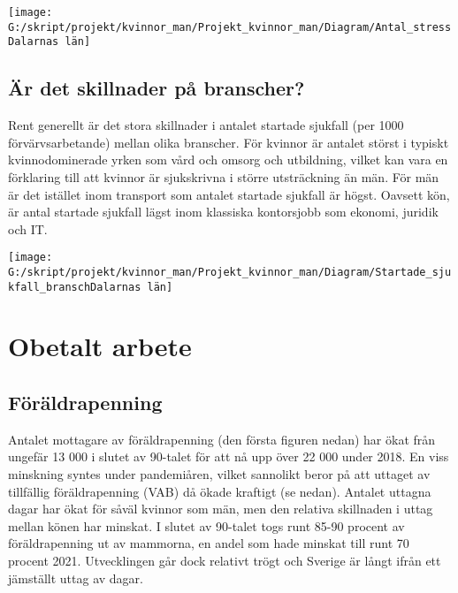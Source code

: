 \documentclass[
]{article}
\begin{document}
\begin{center}\texttt{[image: G:/skript/projekt/kvinnor\_man/Projekt\_kvinnor\_man/Diagram/Antal\_stressDalarnas län]} \end{center}

\hypertarget{uxe4r-det-skillnader-puxe5-branscher}{%
\subsection{Är det skillnader på
branscher?}\label{uxe4r-det-skillnader-puxe5-branscher}}

Rent generellt är det stora skillnader i antalet startade sjukfall (per
1000 förvärvsarbetande) mellan olika branscher. För kvinnor är antalet
störst i typiskt kvinnodominerade yrken som vård och omsorg och
utbildning, vilket kan vara en förklaring till att kvinnor är
sjukskrivna i större utsträckning än män. För män är det istället inom
transport som antalet startade sjukfall är högst. Oavsett kön, är antal
startade sjukfall lägst inom klassiska kontorsjobb som ekonomi, juridik
och IT.

\begin{center}\texttt{[image: G:/skript/projekt/kvinnor\_man/Projekt\_kvinnor\_man/Diagram/Startade\_sjukfall\_branschDalarnas län]} \end{center}

\hypertarget{obetalt-arbete}{%
\section{Obetalt arbete}\label{obetalt-arbete}}

\hypertarget{fuxf6ruxe4ldrapenning}{%
\subsection{Föräldrapenning}\label{fuxf6ruxe4ldrapenning}}

Antalet mottagare av föräldrapenning (den första figuren nedan) har ökat
från ungefär 13 000 i slutet av 90-talet för att nå upp över 22 000
under 2018. En viss minskning syntes under pandemiåren, vilket sannolikt
beror på att uttaget av tillfällig föräldrapenning (VAB) då ökade
kraftigt (se nedan). Antalet uttagna dagar har ökat för såväl kvinnor
som män, men den relativa skillnaden i uttag mellan könen har minskat. I
slutet av 90-talet togs runt 85-90 procent av föräldrapenning ut av
mammorna, en andel som hade minskat till runt 70 procent 2021.
Utvecklingen går dock relativt trögt och Sverige är långt ifrån ett
jämställt uttag av dagar.
\end{document}
